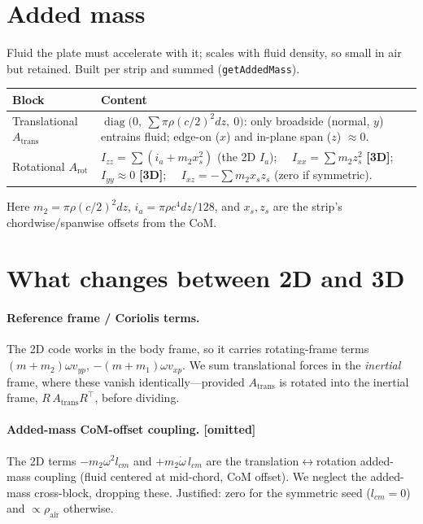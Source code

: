 \documentclass[11pt]{article}
\newcommand{\newin}{{\small\textbf{\color{blue}[3D]}}}
\newcommand{\drop}{{\small\textbf{\color{red!70!black}[omitted]}}}
\begin{document}
\section*{Added mass}
Fluid the plate must accelerate with it; scales with fluid density, so small in air
but retained. Built per strip and summed (\texttt{getAddedMass}).

\begin{tabularx}{\textwidth}{@{} l L @{}}
\toprule
\textbf{Block} & \textbf{Content} \\
\midrule
Translational $A_{\text{trans}}$ &
$\operatorname{diag}\!\big(0,\ \textstyle\sum \pi\rho(c/2)^2 dz,\ 0\big)$: only broadside (normal, $y$)
entrains fluid; edge-on ($x$) and in-plane span ($z$) $\approx 0$. \\
Rotational $A_{\text{rot}}$ &
$I_{zz}=\sum(i_a+m_2 x_s^2)$ (the 2D $I_a$); \ \ $I_{xx}=\sum m_2 z_s^2$ \newin{}; \ \
$I_{yy}\approx 0$ \newin{}; \ \ $I_{xz}=-\sum m_2 x_s z_s$ (zero if symmetric). \\
\bottomrule
\end{tabularx}

\noindent Here $m_2=\pi\rho(c/2)^2 dz$, $i_a=\pi\rho c^4 dz/128$, and $x_s,z_s$ are
the strip's chordwise/spanwise offsets from the CoM.

\section*{What changes between 2D and 3D}

\paragraph{Reference frame / Coriolis terms.} The 2D code works in the body frame,
so it carries rotating-frame terms $(m{+}m_2)\omega v_{yp}$, $-(m{+}m_1)\omega v_{xp}$.
We sum translational forces in the \emph{inertial} frame, where these vanish
identically---provided $A_{\text{trans}}$ is rotated into the inertial frame,
$R\,A_{\text{trans}}R^{\top}$, before dividing.

\paragraph{Added-mass CoM-offset coupling. \drop{}} The 2D terms
$-m_2\omega^2 l_{cm}$ and $+m_2\dot\omega\, l_{cm}$ are the translation$\leftrightarrow$rotation
added-mass coupling (fluid centered at mid-chord, CoM offset). We neglect the
added-mass cross-block, dropping these. Justified: zero for the symmetric seed
($l_{cm}=0$) and $\propto\rho_{\text{air}}$ otherwise.
\end{document}
